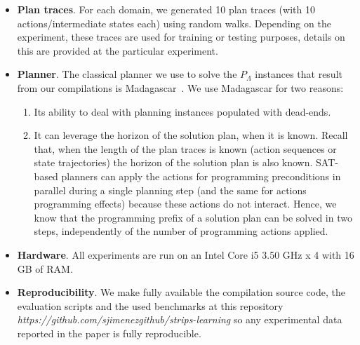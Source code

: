 \begin{itemize}

\item {\bf Plan traces}. For each domain, we generated 10 plan traces (with 10 actions/intermediate states each) using random walks. Depending on the experiment, these traces are used for training or testing purposes, details on this are provided at the particular experiment.

\item {\bf Planner}. The classical planner we use to solve the $P_\Lambda$ instances that result from our compilations is {\sc Madagascar}~\cite{rintanen2014madagascar}. We use {\sc Madagascar} for two reasons:
  \begin{enumerate}
  \item  Its ability to deal with planning instances populated with dead-ends.
  \item  It can leverage the horizon of the solution plan, when it is known. Recall that, when the length of the plan traces is known (\FO action sequences or \FO state trajectories) the horizon of the solution plan is also known. SAT-based planners can apply the actions for programming preconditions in parallel during a single planning step (and the same for actions programming effects) because these actions do not interact. Hence, we know that the programming prefix of a solution plan can be solved in two steps, independently of the number of programming actions applied.
  \end{enumerate}

\item {\bf Hardware}. All experiments are run on an Intel Core i5 3.50 GHz x 4 with 16 GB of RAM.

\item {\bf Reproducibility}. We make fully available the compilation source code, the evaluation scripts and the used benchmarks at this repository {\em https://github.com/sjimenezgithub/strips-learning} so any experimental data reported in the paper is fully reproducible.
\end{itemize}

